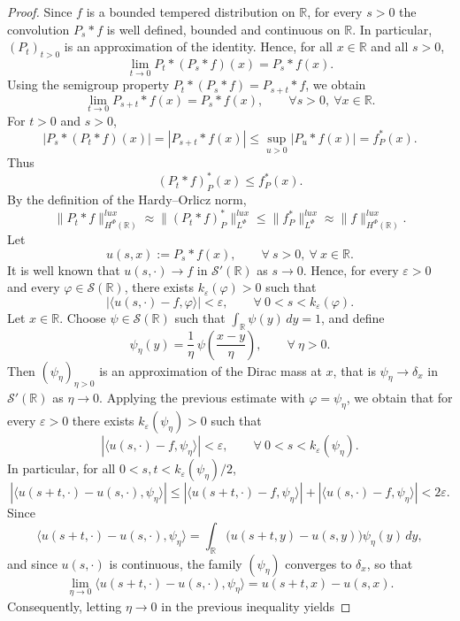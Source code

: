 \documentclass[a4paper,12pt,intlimits,oneside]{amsart}
\theoremstyle{definition}
\numberwithin{equation}{section}
\theoremstyle{definition}
\begin{document}
\begin{proof}
Since $f$ is a bounded tempered distribution on $\mathbb{R}$, for every $s>0$ the convolution $P_s*f$ is well defined, bounded and continuous on $\mathbb{R}$. In particular, $(P_t)_{t>0}$ is an approximation of the identity. Hence, for all $x\in\mathbb{R}$ and all $s>0$,
\[
\lim_{t\to 0} P_t*(P_s*f)(x)=P_s*f(x).
\]
Using the semigroup property $P_t*(P_s*f)=P_{s+t}*f$, we obtain
\begin{equation}\label{eq:pointwise_limit}
\lim_{t\to 0} P_{s+t}*f(x)=P_s*f(x),
\qquad \forall s>0,\ \forall x\in\mathbb{R}.
\end{equation}
For $t>0$ and $s>0$,
\[
|P_s*(P_t*f)(x)|
=
|P_{s+t}*f(x)|
\le
\sup_{u>0}|P_u*f(x)|
=
f_P^*(x).
\]
Thus
\[
(P_t*f)_P^*(x)\le f_P^*(x).
\]
By the definition of the Hardy–Orlicz norm,
\[
\|P_t*f\|_{H^\Phi(\mathbb{R})}^{lux}
\approx
\|(P_t*f)_P^*\|_{L^\Phi}^{lux}
\le
\|f_P^*\|_{L^\Phi}^{lux}
\approx
\|f\|_{H^\Phi(\mathbb{R})}^{lux}.
\]
Let
\[
u(s,x):=P_s*f(x), \qquad \forall~s>0,\ \forall~ x\in\mathbb{R}.
\]
It is well known that $u(s,\cdot)\longrightarrow f$
in  $\mathscr S'(\mathbb{R})$  as  $s\to 0$.
Hence, for every $\varepsilon>0$ and every $\varphi\in\mathscr S(\mathbb{R})$, there exists
$k_{\varepsilon}(\varphi)>0$ such that
\[
|\langle u(s,\cdot)-f,\varphi\rangle|
<
\varepsilon,
\qquad \forall~ 0<s<k_{\varepsilon}(\varphi).
\]
Let $x\in\mathbb{R}$.  
Choose $\psi\in\mathscr S(\mathbb{R})$ such that
$\int_{\mathbb R}\psi(y)\,dy=1$,
and define
\[
\psi_\eta(y)=\frac1\eta\,\psi\!\left(\frac{x-y}{\eta}\right),
\qquad \forall~ \eta>0 .
\]
Then $(\psi_\eta)_{\eta>0}$ is an approximation of the Dirac mass at $x$, that is $\psi_\eta\longrightarrow \delta_x$ in  $\mathscr S'(\mathbb{R})$  as  $\eta\to 0$.
Applying the previous estimate with $\varphi=\psi_\eta$, we obtain that for every
$\varepsilon>0$ there exists $k_{\varepsilon}(\psi_\eta)>0$ such that
\[
|\langle u(s,\cdot)-f,\psi_\eta\rangle|
<
\varepsilon,
\qquad \forall~ 0<s<k_{\varepsilon}(\psi_\eta).
\]
In particular, for all $0<s,t<k_{\varepsilon}(\psi_\eta)/2$,
\[
|\langle u(s+t,\cdot)-u(s,\cdot),\psi_\eta\rangle|
\le
|\langle u(s+t,\cdot)-f,\psi_\eta\rangle|
+
|\langle u(s,\cdot)-f,\psi_\eta\rangle|
<
2\varepsilon .
\]
Since
\[
\langle u(s+t,\cdot)-u(s,\cdot),\psi_\eta\rangle
=
\int_{\mathbb R}
\bigl(u(s+t,y)-u(s,y)\bigr)\psi_\eta(y)\,dy,
\]
and since $u(s,\cdot)$ is continuous, the family $(\psi_\eta)$ converges to $\delta_x$,
so that
\[
\lim_{\eta\to 0}
\langle u(s+t,\cdot)-u(s,\cdot),\psi_\eta\rangle
=
u(s+t,x)-u(s,x).
\]
Consequently, letting $\eta\to 0$ in the previous inequality yields

\end{proof}
\end{document}
